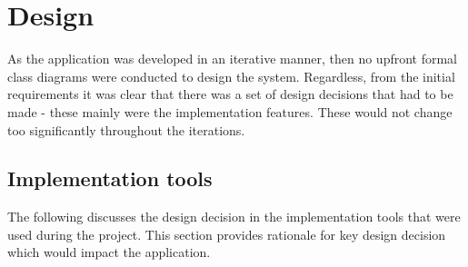 \chapter{Design}







As the application was developed in an iterative manner, then no upfront formal class diagrams were conducted to design the system. Regardless, from the initial requirements it was clear that there was a set of design decisions that had to be made - these mainly were the implementation features. These would not change too significantly throughout the iterations.

\section{Implementation tools}
The following discusses the design decision in the implementation tools that were used during the project. This section provides rationale for key design decision which would impact the application.
